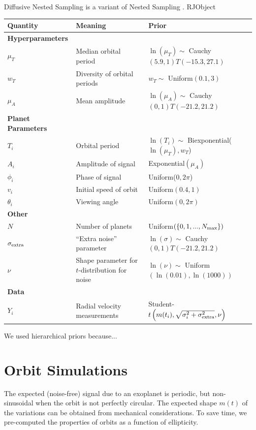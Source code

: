 \documentclass[useAMS,usenatbib]{mn2e}
\begin{document}
Diffusive Nested Sampling \citep{dnest} is a variant of
Nested Sampling \citep{skilling}. RJObject \citep{rjobject}

\begin{table}
\begin{tabular}{|l|l|l|}
\hline
Quantity	&	Meaning		& Prior\\
\hline
{\bf Hyperparameters}	&	\\
$\mu_T$		&	Median orbital period	& $\ln(\mu_T) \sim$ Cauchy$(5.9, 1)T(-15.3, 27.1)$\\
$w_T$		&	Diversity of orbital periods & $w_T \sim$ Uniform$(0.1, 3)$\\
$\mu_A$		&	Mean amplitude	& $\ln(\mu_A) \sim$ Cauchy$(0, 1)T(-21.2, 21.2)$\\
\hline
{\bf Planet Parameters}\\
$T_i$		&	Orbital period	&	$\ln(T_i) \sim $ Biexponential($\ln(\mu_T), w_T$)\\
$A_i$		&	Amplitude of signal	& Exponential$(\mu_A)$\\
$\phi_i$	&	Phase of signal	&	Uniform($0, 2\pi$)\\
$v_i$		&	Initial speed of orbit	&	Uniform$(0.4, 1)$\\
$\theta_i$	&	Viewing angle	&	Uniform$(0, 2\pi)$\\
\hline
{\bf Other}\\
$N$		& Number of planets	& Uniform$(\{0, 1, ..., N_{\rm max}\})$\\
$\sigma_{\rm extra}$	& ``Extra noise'' parameter	& $\ln(\sigma) \sim$ Cauchy$(0, 1)T(-21.2, 21.2)$\\
$\nu$		& Shape parameter for $t$-distribution for noise & $\ln(\nu) \sim$ Uniform$(\ln(0.01), \ln(1000))$\\
\hline
{\bf Data}\\
$Y_i$		& Radial velocity measurements	&
		Student-$t\left(m(t_i), \sqrt{\sigma_i^2 + \sigma_{\rm extra}^2}, \nu\right)$
\end{tabular}
\end{table}

We used hierarchical priors because...

\section{Orbit Simulations}
The expected (noise-free) signal due to an exoplanet is periodic, but
non-sinusoidal when the orbit is not perfectly circular. The expected
shape $m(t)$ of the variations can be obtained from mechanical considerations.
To save time, we pre-computed the properties of orbits as a function of
ellipticity.
\end{document}
